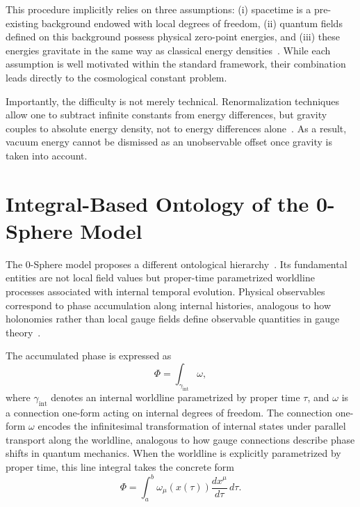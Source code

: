 \documentclass[%
 reprint,
 amsmath,amssymb,
 aps,
 prb,
]{revtex4-2}
\numberwithin{equation}{section}
\begin{document}
This procedure implicitly relies on three assumptions: (i) spacetime is a pre-existing background endowed with local degrees of freedom, (ii) quantum fields defined on this background possess physical zero-point energies, and (iii) these energies gravitate in the same way as classical energy densities~\cite{Zeldovich1967}. While each assumption is well motivated within the standard framework, their combination leads directly to the cosmological constant problem.

Importantly, the difficulty is not merely technical. Renormalization techniques allow one to subtract infinite constants from energy differences, but gravity couples to absolute energy density, not to energy differences alone~\cite{Weinberg1989}. As a result, vacuum energy cannot be dismissed as an unobservable offset once gravity is taken into account.

\section{Integral-Based Ontology of the 0-Sphere Model}
\label{sec:integral_ontology}

The 0-Sphere model proposes a different ontological hierarchy~\cite{hanamura18067760,hanamura18135855,hanamura18203433}. Its fundamental entities are not local field values but proper-time parametrized worldline processes associated with internal temporal evolution. Physical observables correspond to phase accumulation along internal histories, analogous to how holonomies rather than local gauge fields define observable quantities in gauge theory~\cite{AharonovBohm1959,Berry1984}.

The accumulated phase is expressed as
\begin{equation}
\Phi = \int_{\gamma_{\mathrm{int}}} \omega,
\end{equation}
where $\gamma_{\mathrm{int}}$ denotes an internal worldline parametrized by proper time $\tau$, and $\omega$ is a connection one-form acting on internal degrees of freedom. The connection one-form $\omega$ encodes the infinitesimal transformation of internal states under parallel transport along the worldline, analogous to how gauge connections describe phase shifts in quantum mechanics. When the worldline is explicitly parametrized by proper time, this line integral takes the concrete form
\begin{equation}
\Phi = \int_a^b \omega_\mu(x(\tau)) \frac{dx^\mu}{d\tau} \, d\tau.
\end{equation}
\end{document}
